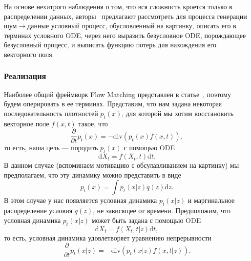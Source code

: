 \documentclass[12pt]{article}
\theoremstyle{definition}
\begin{document}
На основе нехитрого наблюдения о том, что вся сложность кроется только в распределении данных, авторы~\cite{lipman2022flow} предлагают рассмотреть для процесса генерации шум$\rightarrow$данные условный процесс, обусловленный на картинку, описать его в терминах условного ODE, через него выразить безусловное ODE, порождающее безусловный процесс, и выписать функцию потерь для нахождения его векторного поля.

\subsubsection{Реализация}
Наиболее общий фреймворк Flow Matching представлен в статье~\cite{tong2023conditional}, поэтому будем оперировать в ее терминах. Представим, что нам задана некоторая последовательность плотностей $p_t(x)$, для которой мы хотим восстановить векторное поле $f(x, t)$ такое, что
\[
    \frac{\partial}{\partial t} p_t(x) = - \text{div}\left(p_t(x) f(x, t) \right),
\]
то есть, наша цель --- породить $p_t(x)$ с помощью ODE 
\[
    \mathrm{d} X_t = f(X_t, t) \mathrm{d} t.
\]
В данном случае (вспоминаем мотивацию с обсулавливанием на картинку) мы предполагаем, что эту динамику можно представить в виде
\[
    p_t(x) = \int p_t(x | z )q(z) \mathrm{d} z.
\]
В этом случае у нас появляется условная динамика $p_t(x | z)$ и маргинальное распределение условия $q(z)$, не зависящее от времени. Предположим, что условная динамика $p_t(x | z)$ может быть задана с помощью ODE 
\[
   \mathrm{d} X_t = f(X_t, t | z) \mathrm{d} t,
\]
то есть, условная динамика удовлетворяет уравнению непрерывности
\[
    \frac{\partial}{\partial t} p_t(x | z) = - \text{div}\left(p_t(x | z) f(x, t | z) \right).
\]
\end{document}

